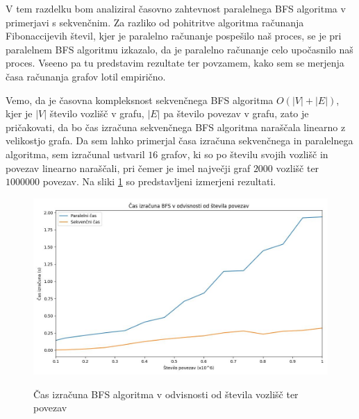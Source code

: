 \documentclass[mat1, tisk]{fmfdelo}
\begin{document}
V tem razdelku bom analiziral časovno zahtevnost paralelnega BFS algoritma v primerjavi s sekvenčnim.
Za razliko od pohitritve algoritma računanja Fibonaccijevih števil, kjer je paralelno računanje pospešilo naš proces,
se je pri paralelnem BFS algoritmu izkazalo, da je paralelno računanje celo upočasnilo naš proces. Vseeno
pa tu predstavim rezultate ter povzamem, kako sem se merjenja časa računanja grafov lotil empirično.

Vemo, da je časovna kompleksnost sekvenčnega BFS algoritma $O(|V| + |E|)$, kjer je $|V|$ število vozlišč v grafu,
$|E|$ pa število povezav v grafu, zato je pričakovati, da bo čas izračuna sekvenčnega BFS algoritma naraščala linearno
z velikostjo grafa. Da sem lahko primerjal časa izračuna sekvenčnega in paralelnega algoritma, sem izračunal ustvaril
$16$ grafov, ki so po številu svojih vozlišč in povezav linearno naraščali, pri čemer je imel največji graf
$2000$ vozlišč ter $1000000$ povezav. Na sliki \ref{fig:bfs_calculation_time_by_graph_size} so predstavljeni izmerjeni
rezultati.

\begin{figure}[h!]
  \centering
  \caption{Čas izračuna BFS algoritma v odvisnosti od števila vozlišč ter povezav}
  \includegraphics[width=15cm]{slike/bfs_v_odvisnosti_od_velikosti_grafa.jpg}
  \label{fig:bfs_calculation_time_by_graph_size}
\end{figure}
\end{document}

